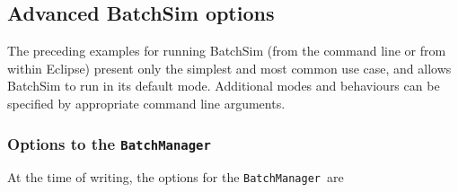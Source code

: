 \documentclass{article}
\newcommand{\BM}{{\tt BatchManager}}
\begin{document}
\subsection{Advanced BatchSim options}

The preceding examples for running BatchSim (from the command line or from within Eclipse) present only the simplest and most common use case, and allows BatchSim to run in its default mode. Additional modes and behaviours can be specified by appropriate command line arguments.

\subsubsection{Options to the \BM}

At the time of writing, the options for the \BM\ are
\end{document}
